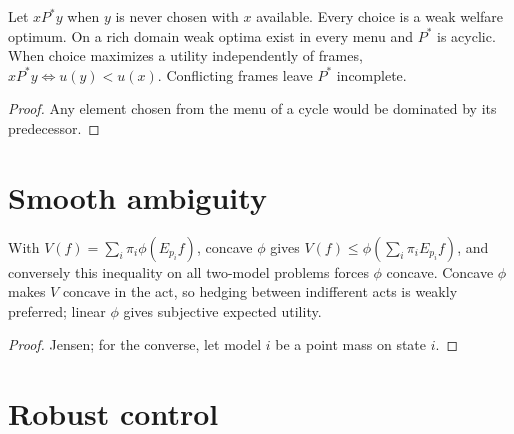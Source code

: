 \begin{theorem}
\label{thm:beh-br}
\leanok
Let $xP^*y$ when $y$ is never chosen with $x$ available. Every choice is a weak welfare optimum. On a rich domain
weak optima exist in every menu and $P^*$ is acyclic. When choice maximizes a utility independently of frames,
$xP^*y\iff u(y)<u(x)$. Conflicting frames leave $P^*$ incomplete.
\end{theorem}
\begin{proof}
\leanok
Any element chosen from the menu of a cycle would be dominated by its predecessor.
\end{proof}

\section{Smooth ambiguity}

\begin{theorem}
\label{thm:beh-kmm}
\leanok
With $V(f)=\sum_i\pi_i\phi(E_{p_i}f)$, concave $\phi$ gives $V(f)\le\phi(\sum_i\pi_iE_{p_i}f)$, and conversely
this inequality on all two-model problems forces $\phi$ concave. Concave $\phi$ makes $V$ concave in the act, so hedging
between indifferent acts is weakly preferred; linear $\phi$ gives subjective expected utility.
\end{theorem}
\begin{proof}
\leanok
Jensen; for the converse, let model $i$ be a point mass on state $i$.
\end{proof}

\section{Robust control}


